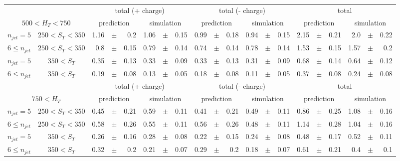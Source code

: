 \documentclass[12pt]{paper}
\begin{document}
\begin{sidewaystable}[ht]
\begin{center}
\begin{tabular}{cc|rrr|rrr|rrr|rrr|rrr|rrr}
& & \multicolumn{6}{c|}{total (+ charge)}&\multicolumn{6}{c|}{total (- charge)}&\multicolumn{6}{c}{total}\\
\multicolumn{2}{c|}{$500< H_{T}< 750$} & \multicolumn{3}{c}{prediction}&\multicolumn{3}{c|}{simulation}&\multicolumn{3}{c}{prediction}&\multicolumn{3}{c|}{simulation}&\multicolumn{3}{c}{prediction}&\multicolumn{3}{c}{simulation}\\\hline
$n_{jet}=5$ & $250< S_{T}< 350$ & 1.16&$\pm$&0.2 & 1.06&$\pm$&0.15 & 0.99&$\pm$&0.18 & 0.94&$\pm$&0.15 & 2.15&$\pm$&0.21 & 2.0&$\pm$&0.22\\
$6\leq n_{jet}$ & $250< S_{T}< 350$ & 0.8&$\pm$&0.15 & 0.79&$\pm$&0.14 & 0.74&$\pm$&0.14 & 0.78&$\pm$&0.14 & 1.53&$\pm$&0.15 & 1.57&$\pm$&0.2\\
$n_{jet}=5$ & $350< S_{T}$ & 0.35&$\pm$&0.13 & 0.33&$\pm$&0.09 & 0.33&$\pm$&0.13 & 0.31&$\pm$&0.09 & 0.68&$\pm$&0.14 & 0.64&$\pm$&0.12\\
$6\leq n_{jet}$ & $350< S_{T}$ & 0.19&$\pm$&0.08 & 0.13&$\pm$&0.05 & 0.18&$\pm$&0.08 & 0.11&$\pm$&0.05 & 0.37&$\pm$&0.08 & 0.24&$\pm$&0.08\\
\hline
& & \multicolumn{6}{c|}{total (+ charge)}&\multicolumn{6}{c|}{total (- charge)}&\multicolumn{6}{c}{total}\\
\multicolumn{2}{c|}{$750< H_{T}$} & \multicolumn{3}{c}{prediction}&\multicolumn{3}{c|}{simulation}&\multicolumn{3}{c}{prediction}&\multicolumn{3}{c|}{simulation}&\multicolumn{3}{c}{prediction}&\multicolumn{3}{c}{simulation}\\\hline
$n_{jet}=5$ & $250< S_{T}< 350$ & 0.45&$\pm$&0.21 & 0.59&$\pm$&0.11 & 0.41&$\pm$&0.21 & 0.49&$\pm$&0.11 & 0.86&$\pm$&0.25 & 1.08&$\pm$&0.16\\
$6\leq n_{jet}$ & $250< S_{T}< 350$ & 0.58&$\pm$&0.26 & 0.55&$\pm$&0.11 & 0.56&$\pm$&0.26 & 0.48&$\pm$&0.11 & 1.14&$\pm$&0.28 & 1.04&$\pm$&0.16\\
$n_{jet}=5$ & $350< S_{T}$ & 0.26&$\pm$&0.16 & 0.28&$\pm$&0.08 & 0.22&$\pm$&0.15 & 0.24&$\pm$&0.08 & 0.48&$\pm$&0.17 & 0.52&$\pm$&0.11\\
$6\leq n_{jet}$ & $350< S_{T}$ & 0.32&$\pm$&0.2 & 0.21&$\pm$&0.07 & 0.29&$\pm$&0.2 & 0.18&$\pm$&0.07 & 0.61&$\pm$&0.21 & 0.4&$\pm$&0.1\\
\end{tabular}
\end{center}
\end{sidewaystable}
\end{document}
